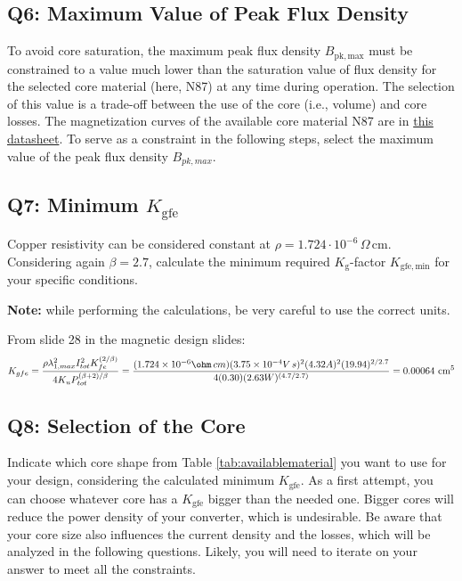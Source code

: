 \documentclass{PELsmallreport}
\begin{document}
\subsection{Q6: Maximum Value of Peak Flux Density} 
To avoid core saturation, the maximum peak flux density $B_\mathrm{pk,max}$ must be constrained to a value much lower than the saturation value of flux density for the selected core material (here, N87) at any time during operation. 
The selection of this value is a trade-off between the use of the core (i.e., volume) and core losses. 
The magnetization curves of the available core material N87 are in \href{https://www.tdk-electronics.tdk.com/download/528882/990c299b916e9f3eb7e44ad563b7f0b9/pdf-n87.pdf}{this datasheet}. 
To serve as a constraint in the following steps, select the maximum value of the peak flux density $B_{pk,max}$. 
\\

 \hfill{}




\subsection{Q7: Minimum $K_\mathrm{gfe}$} 
Copper resistivity can be considered constant at $\rho = 1.724\cdot 10^{-6} \, \Omega \, \mathrm{cm}$. 
Considering again $\beta = 2.7$, calculate the minimum required $K_\mathrm{g}$-factor $K_\mathrm{gfe,min}$ for your specific conditions. 


\textbf{{Note:}} while performing the calculations, be very careful to use the correct units. \\ 

\begin{framed}
	\vspace{2em}
    From slide 28 in the magnetic design slides:
	$$K_{gfe} = \frac{\rho \lambda_{1,max}^2 I_{tot}^2 K_{fe}^{(2/\beta)}}{4 K_u P_{tot}^{(\beta+2)/\beta}} = \frac{({1.724 \times 10^{-6}}{\ohm\,cm})({3.75\times 10^{-4}}{V\,s})^2({4.32}{A})^2({19.94})^{2/{2.7}}}
       {4({0.30})({2.63}{W})^{({4.7}/{2.7})}} = 0.00064 \text{ cm}^5$$

	\vspace{2em}
\end{framed}

 \hfill{}

\subsection{Q8: Selection of the Core} 
Indicate which core shape from Table \ref{tab:availablematerial} you want to use for your design, considering the calculated minimum $K_\mathrm{gfe}$. 
As a first attempt, you can choose whatever core has a $K_\mathrm{gfe}$ bigger than the needed one.
Bigger cores will reduce the power density of your converter, which is undesirable.  
Be aware that your core size also influences the current density and the losses, which will be analyzed in the following questions. 
Likely, you will need to iterate on your answer to meet all the constraints. 
\\
\end{document}

